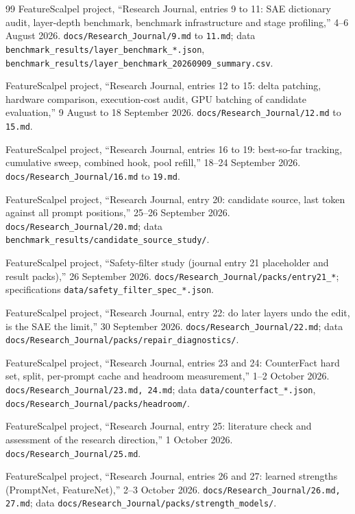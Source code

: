 \begin{thebibliography}{99}
 FeatureScalpel project, ``Research Journal, entries 9 to 11: SAE dictionary audit, layer-depth benchmark, benchmark infrastructure and stage profiling,'' 4--6 August 2026. \texttt{docs/Research\_Journal/9.md} to \texttt{11.md}; data \texttt{benchmark\_results/layer\_benchmark\_*.json}, \texttt{benchmark\_results/layer\_benchmark\_20260909\_summary.csv}.

 FeatureScalpel project, ``Research Journal, entries 12 to 15: delta patching, hardware comparison, execution-cost audit, GPU batching of candidate evaluation,'' 9 August to 18 September 2026. \texttt{docs/Research\_Journal/12.md} to \texttt{15.md}.

 FeatureScalpel project, ``Research Journal, entries 16 to 19: best-so-far tracking, cumulative sweep, combined hook, pool refill,'' 18--24 September 2026. \texttt{docs/Research\_Journal/16.md} to \texttt{19.md}.

 FeatureScalpel project, ``Research Journal, entry 20: candidate source, last token against all prompt positions,'' 25--26 September 2026. \texttt{docs/Research\_Journal/20.md}; data \texttt{benchmark\_results/candidate\_source\_study/}.

 FeatureScalpel project, ``Safety-filter study (journal entry 21 placeholder and result packs),'' 26 September 2026. \texttt{docs/Research\_Journal/packs/entry21\_*}; specifications \texttt{data/safety\_filter\_spec\_*.json}.

 FeatureScalpel project, ``Research Journal, entry 22: do later layers undo the edit, is the SAE the limit,'' 30 September 2026. \texttt{docs/Research\_Journal/22.md}; data \texttt{docs/Research\_Journal/packs/repair\_diagnostics/}.

 FeatureScalpel project, ``Research Journal, entries 23 and 24: CounterFact hard set, split, per-prompt cache and headroom measurement,'' 1--2 October 2026. \texttt{docs/Research\_Journal/23.md, 24.md}; data \texttt{data/counterfact\_*.json}, \texttt{docs/Research\_Journal/packs/headroom/}.

 FeatureScalpel project, ``Research Journal, entry 25: literature check and assessment of the research direction,'' 1 October 2026. \texttt{docs/Research\_Journal/25.md}.

 FeatureScalpel project, ``Research Journal, entries 26 and 27: learned strengths (PromptNet, FeatureNet),'' 2--3 October 2026. \texttt{docs/Research\_Journal/26.md, 27.md}; data \texttt{docs/Research\_Journal/packs/strength\_models/}.


\end{thebibliography}

